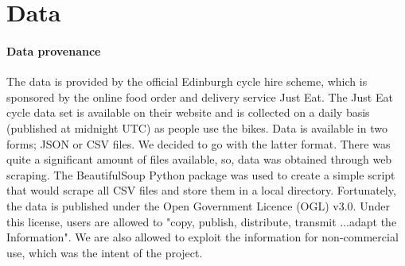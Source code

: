 \documentclass[11pt,a4paper]{article}
\begin{document}
\section{Data}
\vspace{-5mm}
\paragraph{Data provenance} 

The data is provided by the official Edinburgh cycle hire scheme, which is sponsored by the online food order and delivery service Just Eat. The Just Eat cycle data set is available on their website and is collected on a daily basis (published at midnight UTC) as people use the bikes. Data is available in two forms; JSON or CSV files. We decided to go with the latter format. There was quite a significant amount of files available, so, data was obtained through web scraping. The BeautifulSoup Python package was used to create a simple script that would scrape all CSV files and store them in a local directory. Fortunately, the data is published under the Open Government Licence (OGL) v3.0. Under this license,  users are allowed to "copy, publish, distribute, transmit ...adapt the Information". We are also allowed to exploit the information for non-commercial use, which was the intent of the project.   
\vspace*{-1cm}
\end{document}
